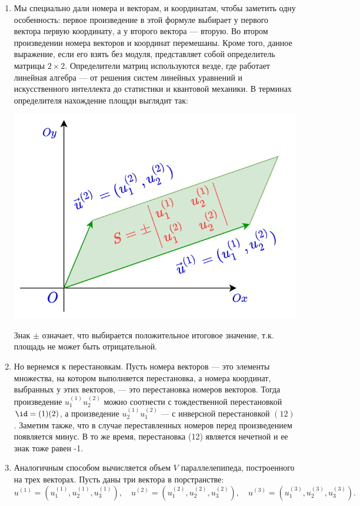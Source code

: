 \begin{enumerate}
\item Мы специально дали номера и векторам, и координатам, чтобы заметить одну особенность: первое произведение в этой формуле выбирает у первого вектора первую координату, а у второго вектора --- вторую. Во втором произведении номера векторов и координат перемешаны. Кроме того, данное выражение, если его взять без модуля, представляет собой определитель матрицы $2\times 2$. Определители матриц используются везде, где работает линейная алгебра --- от решения систем линейных уравнений и искусственного интеллекта до статистики и квантовой механики. В терминах определителя нахождение площди выглядит так:
\begin{center}
\includegraphics[scale=0.4]{paralel2.png}
\end{center}
Знак $\pm$ означает, что выбирается положительное итоговое значение, т.к. площадь не может быть отрицательной.
\item Но вернемся к перестановкам. Пусть номера векторов --- это элементы множества, на котором выполняется перестановка, а номера координат, выбранных у этих векторов, --- это перестановка номеров векторов. Тогда произведение $u^{(1)}_1u^{(2)}_2$ можно соотнести с тождественной перестановкой $\id=(1)(2)$, а произведение $u^{(1)}_2u^{(2)}_1$ --- с инверсной перестановкой $(12)$. Заметим также, что в случае переставленных номеров перед произведением появляется минус. В то же время, перестановка (12) является нечетной и ее знак тоже равен -1.
\item Аналогичным способом вычисляется объем $V$ параллелепипеда, построенного на трех векторах. Пусть даны три вектора в порстранстве:
$$
u^{(1)}=(u^{(1)}_1,u^{(1)}_2,u^{(1)}_3),\quad u^{(2)}=(u^{(2)}_1,u^{(2)}_2,u^{(2)}_3),\quad u^{(3)}=(u^{(3)}_1,u^{(3)}_2,u^{(3)}_3).
$$
\end{enumerate}
